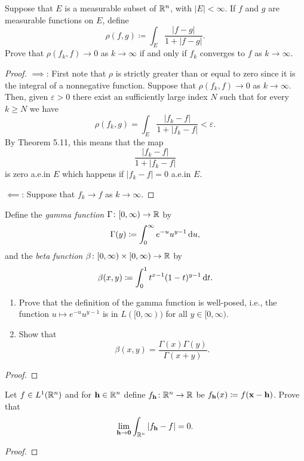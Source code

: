 \begin{problem}
Suppose that $E$ is a measurable subset of $\mathbb{R}^n$, with
$|E|<\infty$. If $f$ and $g$ are measurable functions on
$E$, define
\[
\rho(f,g)\coloneqq\int_E\frac{|f-g|}{1+|f-g|}.
\]
Prove that $\rho(f_k,f)\to 0$ as $k\to\infty$ if and only if $f_k$
converges to $f$ as $k\to\infty$.
\end{problem}
\begin{proof}
$\implies$: First note that $\rho$ is strictly greater than or equal to
zero since it is the integral of a nonnegative function. Suppose that
$\rho(f_k,f)\to 0$ as $k\to\infty$. Then, given $\varepsilon>0$ there exist
an sufficiently large index $N$ such that for every $k\geq N$ we have
\begin{equation}
\label{eq:hypothesis-4}
\rho(f_k,g)=\int_E\frac{|f_k-f|}{1+|f_k-f|}<\varepsilon.
\end{equation}
By Theorem 5.11, this means that the map
\[
\frac{|f_k-f|}{1+|f_k-f|}
\]
is zero a.e.\@ in $E$ which happens if $|f_k-f|=0$ a.e.\@ in $E$.

$\impliedby$: Suppose that $f_k\to f$ as $k\to\infty$.
\end{proof}

\begin{problem}
Define the \emph{gamma function} $\Gamma\colon[0,\infty)\to\mathbb{R}$ by
\[
\Gamma(y)\coloneqq\int_0^\infty e^{-u}u^{y-1}\mathop{}\!\mathrm{d} u,
\]
and the \emph{beta function} $\beta\colon[0,\infty)\times[0,\infty)\to\mathbb{R}$
by
\[
\beta(x,y)\coloneqq\int_0^1 t^{x-1}(1-t)^{y-1}\mathop{}\!\mathrm{d} t.
\]
\begin{enumerate}[label=(\alph*)]
\item Prove that the definition of the gamma function is well-posed, i.e.,
  the function $u\mapsto e^{-u}u^{y-1}$ is in $L([0,\infty))$ for all
  $y\in[0,\infty)$.
\item Show that
\[
\beta(x,y)=\frac{\Gamma(x)\Gamma(y)}{\Gamma(x+y)}.
\]
\end{enumerate}
\end{problem}
\begin{proof}
\end{proof}

\begin{problem}
Let $f\in L^1(\mathbb{R}^n)$ and for $\mathbf{h}\in\mathbb{R}^n$ define
$f_{\mathbf{h}}\colon\mathbb{R}^n\to\mathbb{R}$ be $f_{\mathbf{h}}(x)\coloneqq
f(\mathbf{x}-\mathbf{h})$. Prove that
\[
\lim_{\mathbf{h}\to\mathbf{0}}\int_{\mathbb{R}^n}\left|f_{\mathbf{h}}-f\right|=0.
\]
\end{problem}
\begin{proof}
\end{proof}

